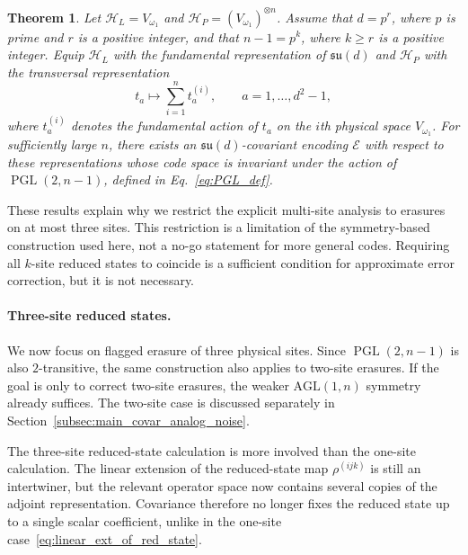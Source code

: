 \documentclass[10pt,twocolumn,superscriptaddress,aps,amsmath,amssymb,citeautoscript,floatfix,prx]{revtex4-2}
\newtheorem{theorem}{Theorem}
\theoremstyle{plain}
\theoremstyle{plain}
\theoremstyle{plain}
\theoremstyle{plain}
\theoremstyle{plain}
\theoremstyle{plain}
\begin{document}
\begin{theorem}\label{thrm:main_3_transitive_covariant_code}
Let $\mathcal H_L=V_{\omega_1}$ and $\mathcal H_P=(V_{\omega_1})^{\otimes n}$. Assume that $d=p^r$, where $p$ is prime and $r$ is a positive integer, and that $n-1=p^k$, where $k\ge r$ is a positive integer. Equip $\mathcal H_L$ with the fundamental representation of $\mathfrak{su}(d)$ and $\mathcal H_P$ with the transversal representation
$$
t_a
\longmapsto
\sum_{i=1}^n t_a^{(i)},
\qquad
a=1,\ldots,d^2-1,
$$
where $t_a^{(i)}$ denotes the fundamental action of $t_a$ on the $i$th physical space $V_{\omega_1}$. For sufficiently large $n$, there exists an $\mathfrak{su}(d)$-covariant encoding $\mathcal E$ with respect to these representations whose code space is invariant under the action of $\operatorname{PGL}(2,n-1)$, defined in Eq.~\eqref{eq:PGL_def}.
\end{theorem}

These results explain why we restrict the explicit multi-site analysis to erasures on at most three sites. This restriction is a limitation of the symmetry-based construction used here, not a no-go statement for more general codes. Requiring all $k$-site reduced states to coincide is a sufficient condition for approximate error correction, but it is not necessary.

\paragraph{Three-site reduced states.}

We now focus on flagged erasure of three physical sites. Since $\operatorname{PGL}(2,n-1)$ is also $2$-transitive, the same construction also applies to two-site erasures. If the goal is only to correct two-site erasures, the weaker $\mathrm{AGL}(1,n)$ symmetry already suffices. The two-site case is discussed separately in Section~\ref{subsec:main_covar_analog_noise}.

The three-site reduced-state calculation is more involved than the one-site calculation. The linear extension of the reduced-state map $\rho^{(ijk)}$ is still an intertwiner, but the relevant operator space now contains several copies of the adjoint representation. Covariance therefore no longer fixes the reduced state up to a single scalar coefficient, unlike in the one-site case~\eqref{eq:linear_ext_of_red_state}.
\end{document}
